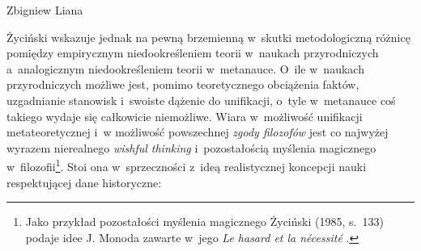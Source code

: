 \begin{artplenv}{Zbigniew Liana}


Życiński wskazuje jednak
\parencite[][s.~133.161--164]{zycinski_teizm_1985} %
 na pewną brzemienną w~skutki metodologiczną różnicę pomiędzy empirycznym niedookreśleniem teorii w~naukach przyrodniczych a~analogicznym niedookreśleniem teorii w~metanauce. O~ile w~naukach przyrodniczych możliwe jest, pomimo teoretycznego obciążenia faktów, uzgadnianie stanowisk i~swoiste dążenie do unifikacji, o~tyle w~metanauce coś takiego wydaje się całkowicie niemożliwe. Wiara w~możliwość unifikacji metateoretycznej i~w możliwość powszechnej \textit{zgody filozofów} jest co najwyżej wyrazem nierealnego \textit{wishful thinking} i~pozostałością myślenia magicznego w~filozofii\footnote{Jako przykład pozostałości myślenia magicznego Życiński (1985, s.~133) podaje idee J. Monoda zawarte w~jego \textit{Le hasard et la nécessité} \parencite*{monod_hasard_1970}.}. Stoi ona w~sprzeczności z~ideą realistycznej koncepcji nauki respektującej dane historyczne:




\end{artplenv}

